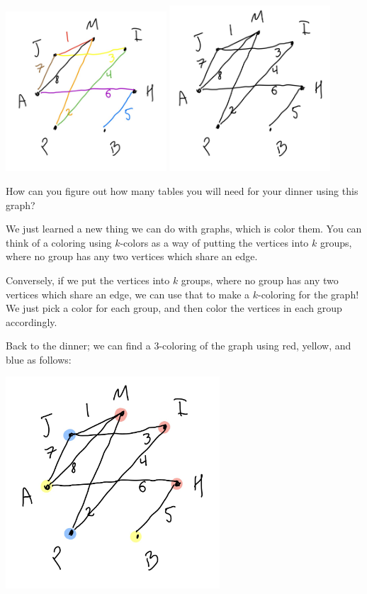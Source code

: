\begin{center}
\includegraphics[width=6cm]{pics/conflict-graph.jpeg}
\includegraphics[width=6cm]{pics/conflict-graph-bw.jpeg}
\end{center}

\begin{question}{}
How can you figure out how many tables you will need for your dinner using this graph?
\end{question}

We just learned a new thing we can do with graphs, which is color them. You can think of a coloring using $k$-colors as a way of putting the vertices into $k$ groups, where no group has any two vertices which share an edge. 

Conversely, if we put the vertices into $k$ groups, where no group has any two vertices which share an edge, we can use that to make a $k$-coloring for the graph! We just pick a color for each group, and then color the vertices in each group accordingly.


Back to the dinner; we can find a 3-coloring of the graph using red, yellow, and blue as follows:

\begin{center}
\includegraphics[width=8cm]{pics/conflict-3-colored.jpeg}
\end{center}

